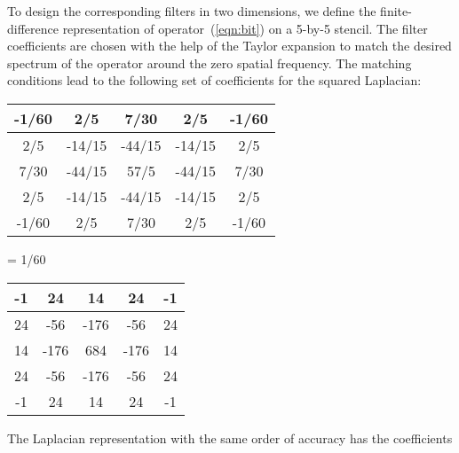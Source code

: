 
\par
To design the corresponding filters in two dimensions, we define the
finite-difference representation of operator~(\ref{eqn:bit}) on a
5-by-5 stencil. The filter coefficients are chosen with the help of
the Taylor expansion to match the desired spectrum of the operator
around the zero spatial frequency.  The matching conditions lead to
the following set of coefficients for the squared Laplacian:
\begin{center}
\begin{tabular}{|c|c|c|c|c|}
\hline 
-1/60 & 2/5 & 7/30 & 2/5 & -1/60 \\
\hline
2/5 & -14/15 & -44/15 & -14/15 & 2/5 \\
\hline
7/30 & -44/15 & 57/5 & -44/15 & 7/30 \\
\hline
2/5 & -14/15 & -44/15 & -14/15 & 2/5 \\
\hline
-1/60 & 2/5 & 7/30 & 2/5 & -1/60 \\
\hline
\end{tabular}
= 1/60
\begin{tabular}{|c|c|c|c|c|}
\hline 
-1 & 24 & 14 & 24 & -1 \\
\hline
24 & -56 & -176 & -56 & 24 \\
\hline
14 & -176 & 684 & -176 & 14 \\
\hline
24 & -56 & -176 & -56 & 24 \\
\hline
-1 & 24 & 14 & 24 & -1 \\
\hline
\end{tabular}
\end{center}
The Laplacian representation with the same order of accuracy has the
coefficients
